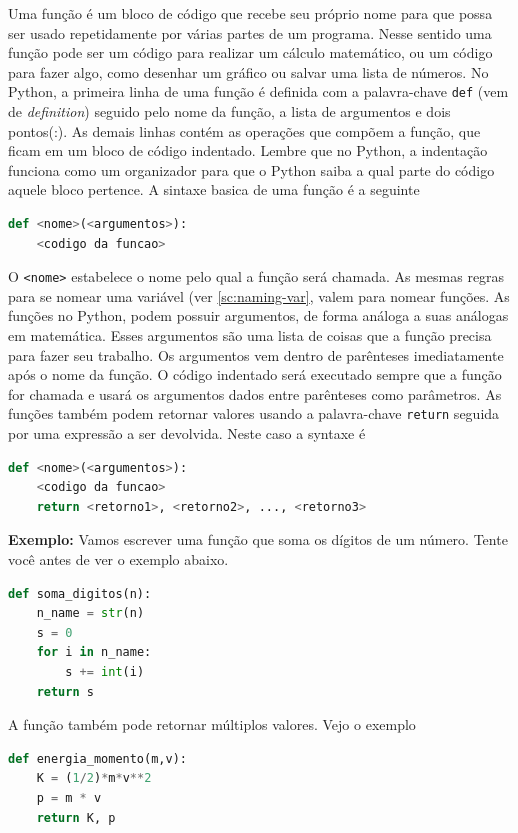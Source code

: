 Uma função é um bloco de código que recebe seu próprio nome para que possa ser
usado repetidamente por várias partes de um programa. Nesse sentido uma função pode ser um código para realizar um cálculo matemático, ou um código para fazer algo, como desenhar um gráfico ou salvar uma lista de números. No Python, a primeira linha de uma função é definida com a palavra-chave {\tt def} (vem de {\it definition}) seguido pelo nome da função, a lista de argumentos e dois pontos(:). As demais linhas contém as operações que compõem a função, que ficam em um bloco de código indentado. Lembre que no Python, a indentação funciona como um organizador para que o Python saiba a qual parte do código aquele bloco pertence. A sintaxe basica de uma função é a seguinte
\begin{lstlisting}[language=Python]
def <nome>(<argumentos>):
    <codigo da funcao>
\end{lstlisting}
O {\tt<nome>} estabelece o nome pelo qual a função será chamada. As mesmas regras para se nomear uma variável (ver \ref{sc:naming-var}, valem para nomear funções. As funções no Python, podem possuir argumentos, de forma análoga a suas análogas em matemática.  Esses argumentos são uma lista de coisas que a função precisa para fazer seu trabalho. Os argumentos vem dentro de parênteses imediatamente após o nome da função. O código indentado será executado sempre que a função for chamada e usará os argumentos dados entre parênteses como parâmetros.
As funções também podem retornar valores usando a palavra-chave {\tt return} seguida por uma expressão  a ser devolvida. Neste caso a syntaxe é
\begin{lstlisting}[language=Python]
def <nome>(<argumentos>):
    <codigo da funcao>
    return <retorno1>, <retorno2>, ..., <retorno3>
\end{lstlisting}

{\bf Exemplo:} Vamos escrever uma função que soma os dígitos de um número. Tente você antes
de ver o exemplo abaixo.
\begin{lstlisting}[language=Python]
def soma_digitos(n):
    n_name = str(n)
    s = 0
    for i in n_name:
        s += int(i)  
    return s
\end{lstlisting}

A função também pode retornar múltiplos valores. Vejo o exemplo

\begin{lstlisting}[language=Python]
def energia_momento(m,v):
    K = (1/2)*m*v**2
    p = m * v
    return K, p
\end{lstlisting}

